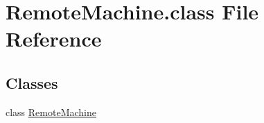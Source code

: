 \hypertarget{RemoteMachine_8class}{\section{Remote\-Machine.\-class File Reference}
\label{RemoteMachine_8class}
}
\subsection*{Classes}
\begin{DoxyCompactItemize}
\item 
class \hyperlink{classRemoteMachine}{Remote\-Machine}
\end{DoxyCompactItemize}

